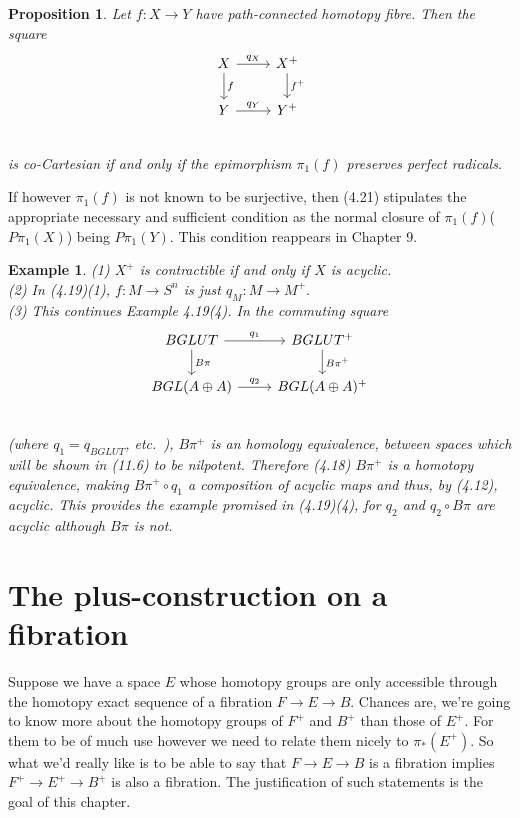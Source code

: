 \documentclass[openany,leqno]{book}  %
\newtheorem{prop}[theorem]{Proposition}
\newtheorem{ex}[theorem]{Example}
\begin{document}
\begin{prop}\label{5.11}
 	Let $f\colon   X\longrightarrow Y$ have path-connected homotopy fibre. Then the square 
\[
 \begin{tikzcd}
 X \arrow{d}{f} \arrow{r}{q_X}  & X^+ \arrow{d}{f^+}\\
 Y \arrow{r}{q_Y} &  Y^+\\
 \end{tikzcd}
 \]
is co-Cartesian if and only if the epimorphism $\pi_1(f)$ preserves perfect radicals.
 \end{prop} 

If however $\pi_1(f)$ is not known to be surjective, then (4.21) stipulates the appropriate necessary and sufficient condition as the normal closure of $\pi_1(f)$($P\pi_1(X)$) being $P\pi_1(Y)$. This condition reappears in Chapter 9.

\begin{ex}
	(1) $X^+$ is contractible if and only if $X$ is acyclic. \\
 (2) In (4.19)(1), $f\colon   M\longrightarrow S^n$ is just $q_M \colon   M\longrightarrow M^+.$ \\
(3) This continues Example 4.19(4). In the commuting square
\[
 \begin{tikzcd}
 BGLUT \arrow{d}{B\pi} \arrow{r}{q_1}  & BGLUT^+ \arrow{d}{B\pi^+}\\
 BGL(A\oplus A) \arrow{r}{q_2} &  BGL(A\oplus A)^+\\
 \end{tikzcd}
 \]
(where $q_1= q_{BGLUT}$, etc.\ ), $B\pi^+$ is an homology equivalence, between spaces which will be shown in (11.6) to be nilpotent. Therefore (4.18) $B\pi^+$ is a {\em homotopy equivalence}, making $B\pi^+ \circ q_1$ a composition of acyclic maps and thus, by (4.12), acyclic. This provides the example promised in
(4.19)(4), for $q_2$ and $q_2\circ B\pi$ are acyclic although $B\pi$ is not.
\end{ex}


\chapter{The plus-construction on a fibration} %
\label{cha:6the_plus_construction_on_a_fibration}
Suppose we have a space $E$ whose homotopy groups are only accessible through the homotopy exact sequence of a fibration $F \longrightarrow E \longrightarrow  B$. Chances are, we're going to know more about the homotopy groups of $F^+$ and $B^+$ than those of $E^+$. For them to be of much use however we need to relate them nicely to $\pi_*(E^+)$. So what we'd really like is to be able to say that $F \longrightarrow  E \longrightarrow B$ is a fibration implies $F^+ \longrightarrow E^+\longrightarrow  B^+$ is also a fibration. The justification of such statements is the goal of this chapter.
\end{document}
